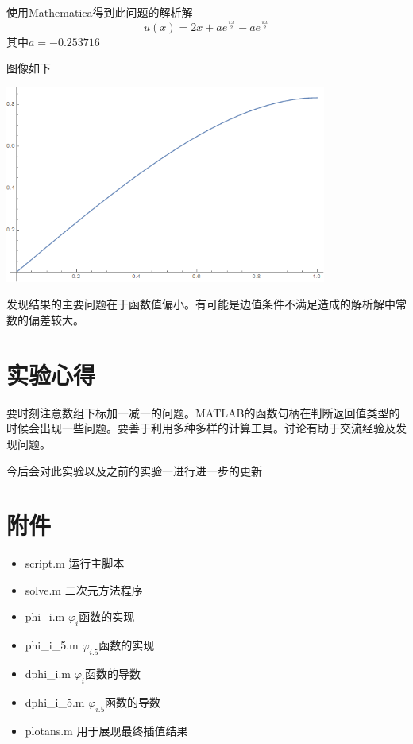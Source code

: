 \documentclass[11pt, a4paper]{article}
\begin{document}
使用Mathematica得到此问题的解析解
\begin{equation}
	u(x)=2x+ae^{\frac{\pi x}{2}}-ae^{\frac{\pi x}{2}} 
\end{equation}
其中$a=-0.253716$

图像如下

\vspace{10pt}
\includegraphics[width=300pt]{real.png}
\vspace{10pt}

发现结果的主要问题在于函数值偏小。有可能是边值条件不满足造成的解析解中常数的偏差较大。

\section{实验心得}

要时刻注意数组下标加一减一的问题。MATLAB的函数句柄在判断返回值类型的时候会出现一些问题。要善于利用多种多样的计算工具。讨论有助于交流经验及发现问题。

今后会对此实验以及之前的实验一进行进一步的更新

\section{附件}
\begin{itemize}
	\item script.m 运行主脚本
	\item solve.m 二次元方法程序
	\item phi\_i.m $\varphi_i$函数的实现
	\item phi\_i\_5.m $\varphi_{i.5}$函数的实现
	\item dphi\_i.m $\varphi_i$函数的导数
	\item dphi\_i\_5.m $\varphi_{i.5}$函数的导数
	\item plotans.m 用于展现最终插值结果
\end{itemize}
\end{document}
